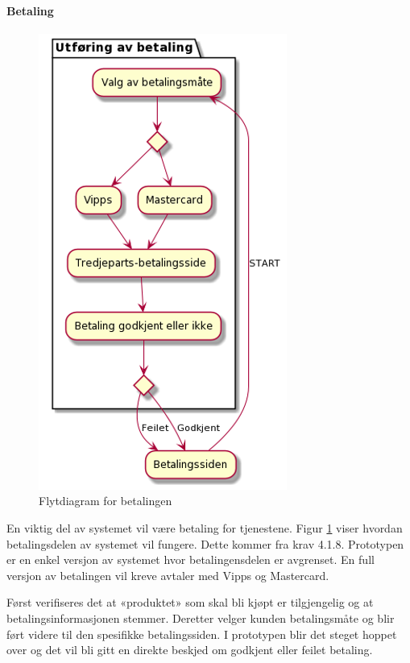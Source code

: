 \paragraph{Betaling}
\begin{figure}[H]
    \centering
    \includegraphics{bilder/uml/betaling.png}
    \caption{Flytdiagram for betalingen}
    \label{fig:betaling}
\end{figure}

En viktig del av systemet vil være betaling for tjenestene. Figur \ref{fig:betaling} viser hvordan betalingsdelen av systemet vil fungere. Dette kommer fra krav 4.1.8. Prototypen er en enkel versjon av systemet hvor betalingensdelen er avgrenset. En full versjon av betalingen vil kreve avtaler med Vipps og Mastercard.  

Først verifiseres det at «produktet» som skal bli kjøpt er tilgjengelig og at betalingsinformasjonen stemmer. Deretter velger kunden betalingsmåte og blir ført videre til den spesifikke betalingssiden. I prototypen blir det steget hoppet over og det vil bli gitt en direkte beskjed om godkjent eller feilet betaling. 




